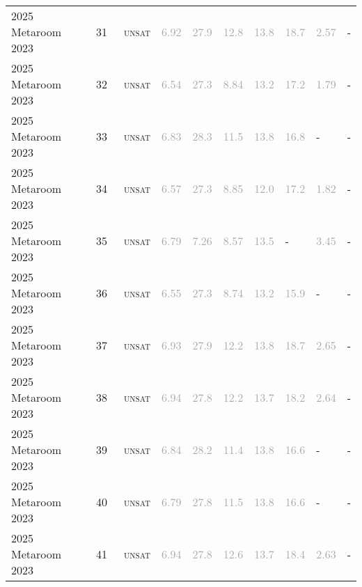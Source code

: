 \begin{center}
{\begin{longtable}{@{}llllllllll@{}}
2025 Metaroom 2023 & 31 & ~\textsc{unsat} & \textcolor{darkgray}{6.92} & \textcolor{darkgray}{27.9} & \textcolor{darkgray}{12.8} & \textcolor{darkgray}{13.8} & \textcolor{darkgray}{18.7} & \textcolor{darkgray}{2.57} & - \\
2025 Metaroom 2023 & 32 & ~\textsc{unsat} & \textcolor{darkgray}{6.54} & \textcolor{darkgray}{27.3} & \textcolor{darkgray}{8.84} & \textcolor{darkgray}{13.2} & \textcolor{darkgray}{17.2} & \textcolor{darkgray}{1.79} & - \\
2025 Metaroom 2023 & 33 & ~\textsc{unsat} & \textcolor{darkgray}{6.83} & \textcolor{darkgray}{28.3} & \textcolor{darkgray}{11.5} & \textcolor{darkgray}{13.8} & \textcolor{darkgray}{16.8} & - & - \\
2025 Metaroom 2023 & 34 & ~\textsc{unsat} & \textcolor{darkgray}{6.57} & \textcolor{darkgray}{27.3} & \textcolor{darkgray}{8.85} & \textcolor{darkgray}{12.0} & \textcolor{darkgray}{17.2} & \textcolor{darkgray}{1.82} & - \\
2025 Metaroom 2023 & 35 & ~\textsc{unsat} & \textcolor{darkgray}{6.79} & \textcolor{darkgray}{7.26} & \textcolor{darkgray}{8.57} & \textcolor{darkgray}{13.5} & - & \textcolor{darkgray}{3.45} & - \\
2025 Metaroom 2023 & 36 & ~\textsc{unsat} & \textcolor{darkgray}{6.55} & \textcolor{darkgray}{27.3} & \textcolor{darkgray}{8.74} & \textcolor{darkgray}{13.2} & \textcolor{darkgray}{15.9} & - & - \\
2025 Metaroom 2023 & 37 & ~\textsc{unsat} & \textcolor{darkgray}{6.93} & \textcolor{darkgray}{27.9} & \textcolor{darkgray}{12.2} & \textcolor{darkgray}{13.8} & \textcolor{darkgray}{18.7} & \textcolor{darkgray}{2.65} & - \\
2025 Metaroom 2023 & 38 & ~\textsc{unsat} & \textcolor{darkgray}{6.94} & \textcolor{darkgray}{27.8} & \textcolor{darkgray}{12.2} & \textcolor{darkgray}{13.7} & \textcolor{darkgray}{18.2} & \textcolor{darkgray}{2.64} & - \\
2025 Metaroom 2023 & 39 & ~\textsc{unsat} & \textcolor{darkgray}{6.84} & \textcolor{darkgray}{28.2} & \textcolor{darkgray}{11.4} & \textcolor{darkgray}{13.8} & \textcolor{darkgray}{16.6} & - & - \\
2025 Metaroom 2023 & 40 & ~\textsc{unsat} & \textcolor{darkgray}{6.79} & \textcolor{darkgray}{27.8} & \textcolor{darkgray}{11.5} & \textcolor{darkgray}{13.8} & \textcolor{darkgray}{16.6} & - & - \\
2025 Metaroom 2023 & 41 & ~\textsc{unsat} & \textcolor{darkgray}{6.94} & \textcolor{darkgray}{27.8} & \textcolor{darkgray}{12.6} & \textcolor{darkgray}{13.7} & \textcolor{darkgray}{18.4} & \textcolor{darkgray}{2.63} & - \\

\end{longtable}}
\end{center}
